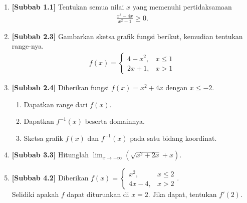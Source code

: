 \documentclass[10pt,openany,a4paper]{article}
\theoremstyle{definition}
\theoremstyle{definition}
\theoremstyle{plain}
\begin{document}
\begin{enumerate}
    \item \textbf{[Subbab 1.1]} Tentukan semua nilai $x$ yang memenuhi pertidaksamaan
    \begin{align*}
        \frac{x^3-4x}{x^2-1}\geq 0.
    \end{align*}

    \item \textbf{[Subbab 2.3]} Gambarkan sketsa grafik fungsi berikut, kemudian tentukan range-nya.
    \begin{align*}
        f(x)=\begin{cases}
            4-x^2, & x\leq 1\\
            2x+1, & x>1
        \end{cases}
    \end{align*}

    \item \textbf{[Subbab 2.4]} Diberikan fungsi $f(x)=x^2+4x$ dengan $x\leq -2$.
    \begin{enumerate}
        \item Dapatkan range dari $f(x)$.
        \item Dapatkan $f^{-1}(x)$ beserta domainnya.
        \item Sketsa grafik $f(x)$ dan $f^{-1}(x)$ pada satu bidang koordinat.
    \end{enumerate}

    \item \textbf{[Subbab 3.3]} Hitunglah $\displaystyle\lim_{x\to-\infty}\left(\sqrt{x^2+2x}+x\right)$.

    \item \textbf{[Subbab 4.2]} Diberikan $f(x)=\begin{cases}
        x^2, & x\leq 2\\
        4x-4, & x>2
    \end{cases}$.\\
    Selidiki apakah $f$ dapat diturunkan di $x=2$. Jika dapat, tentukan $f'(2)$.
\end{enumerate}

\newpage
\end{document}
